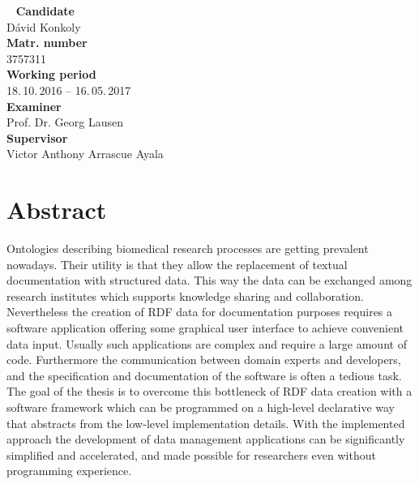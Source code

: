 


%
\newpage
~\vfill
\noindent \textbf{Candidate}\smallskip{}
\\
Dávid Konkoly \smallskip{}
\\
\noindent \textbf{Matr. number}\smallskip{}
\\
3757311 \smallskip{}
\\
\textbf{Working period}\smallskip{}
\\
18.\,10.\,2016 -- 16.\,05.\,2017 \smallskip{}
\\
\textbf{Examiner}\smallskip{}
\\
Prof. Dr. Georg Lausen\smallskip{}
\\
\textbf{Supervisor}\smallskip{}
\\
Victor Anthony Arrascue Ayala\\

\newpage
\chapter*{Abstract}


Ontologies describing biomedical research processes are getting prevalent nowadays. Their utility is that they allow the replacement of textual documentation with structured data. This way the data can be exchanged among research institutes which supports knowledge sharing and collaboration. Nevertheless the creation of RDF data for documentation purposes requires a software application offering some graphical user interface to achieve convenient data input. Usually such applications are complex and require a large amount of code. Furthermore the communication between domain experts and developers, and the specification and documentation of the software is often a tedious task. The goal of the thesis is to overcome this bottleneck of RDF data creation with a software framework which can be programmed on a high-level declarative way that abstracts from the low-level implementation details. With the implemented approach the development of data management applications can be significantly simplified and accelerated, and made possible for researchers even without programming experience.

